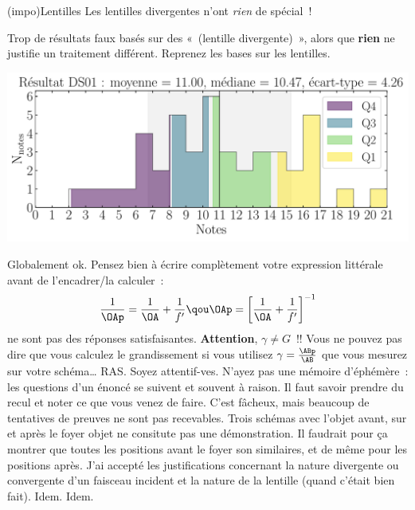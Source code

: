 \documentclass[a4paper, 10pt, final, garamond]{book}
\begin{document}
\begin{tcb}[bld,cnt,fontupper=\Large](impo){Lentilles}
Les lentilles divergentes n'ont \textit{rien} de spécial~!
\end{tcb}
Trop de résultats faux basés sur des «~(lentille divergente)~», alors que
\textbf{rien} ne justifie un traitement différent. Reprenez les bases sur les
lentilles.

\begin{center}
	\includegraphics[width=.7\linewidth]{DS01_rslt.pdf}
\end{center}

\begin{enumerate}
   Globalement ok. Pensez bien à écrire complètement votre expression
    littérale avant de l'encadrer/la calculer~:
    \[
      \frac{1}{\OAp} = \frac{1}{\OA} + \frac{1}{f'}
      \qou
      \OAp = \left[\frac{1}{\OA} + \frac{1}{f'}\right]^{-1}
    \]
    ne sont pas des réponses satisfaisantes.
    \smallbreak
    \textbf{Attention}, $\gamma \neq G$~!!
     Vous ne pouvez pas dire que vous calculez le grandissement si vous
    utilisez $\gamma = \frac{\ABp}{\AB}$ que vous mesurez sur votre schéma…
     RAS.
     Soyez attentif-ves. N'ayez pas une mémoire d'éphémère~: les
    questions d'un énoncé se suivent et souvent à raison. Il faut savoir prendre
    du recul et noter ce que vous venez de faire.
     C'est fâcheux, mais beaucoup de tentatives de preuves ne sont pas
    recevables. Trois schémas avec l'objet avant, sur et après le foyer objet ne
    consitute pas une démonstration. Il faudrait pour ça montrer que toutes les
    positions avant le foyer son similaires, et de même pour les positions
    après. J'ai accepté les justifications concernant la nature divergente ou
    convergente d'un faisceau incident et la nature de la lentille (quand
    c'était bien fait).
     Idem.
     Idem.
\end{enumerate}
\end{document}
